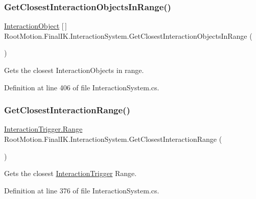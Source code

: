 \subsubsection{\texorpdfstring{Get\+Closest\+Interaction\+Objects\+In\+Range()}{GetClosestInteractionObjectsInRange()}}
{\footnotesize\ttfamily \mbox{\hyperlink{class_root_motion_1_1_final_i_k_1_1_interaction_object}{Interaction\+Object}} \mbox{[}$\,$\mbox{]} Root\+Motion.\+Final\+I\+K.\+Interaction\+System.\+Get\+Closest\+Interaction\+Objects\+In\+Range (\begin{DoxyParamCaption}{ }\end{DoxyParamCaption})}



Gets the closest Interaction\+Objects in range. 



Definition at line 406 of file Interaction\+System.\+cs.

\mbox{\label{class_root_motion_1_1_final_i_k_1_1_interaction_system_ac54c2cb302491c4bb1901354ae20022b}} 
\subsubsection{\texorpdfstring{Get\+Closest\+Interaction\+Range()}{GetClosestInteractionRange()}}
{\footnotesize\ttfamily \mbox{\hyperlink{class_root_motion_1_1_final_i_k_1_1_interaction_trigger_1_1_range}{Interaction\+Trigger.\+Range}} Root\+Motion.\+Final\+I\+K.\+Interaction\+System.\+Get\+Closest\+Interaction\+Range (\begin{DoxyParamCaption}{ }\end{DoxyParamCaption})}



Gets the closest \mbox{\hyperlink{class_root_motion_1_1_final_i_k_1_1_interaction_trigger}{Interaction\+Trigger}} Range. 



Definition at line 376 of file Interaction\+System.\+cs.

\mbox{\label{class_root_motion_1_1_final_i_k_1_1_interaction_system_a8de7dba4c5de727e21faa9ed94b2516a}} 
